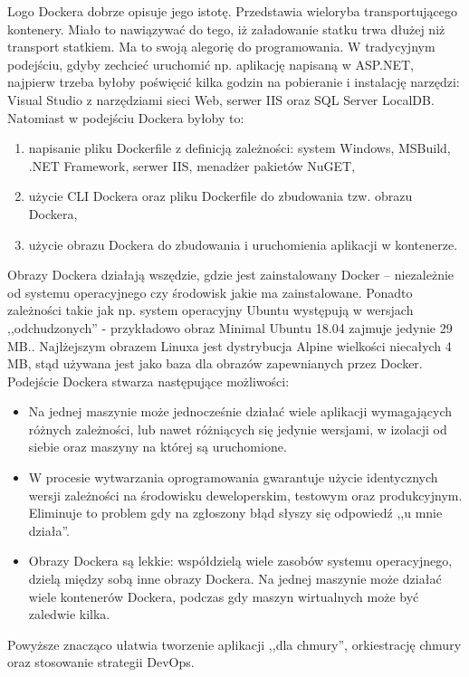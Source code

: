 \documentclass[12pt,a4paper,twoside,titlepage,openright]{book}
\begin{document}
Logo Dockera dobrze opisuje jego istotę. Przedstawia wieloryba transportującego kontenery. Miało to nawiązywać do tego, iż załadowanie statku trwa dłużej niż transport statkiem. Ma to swoją alegorię do programowania. W tradycyjnym podejściu, gdyby zechcieć uruchomić np. aplikację napisaną w ASP.NET, najpierw trzeba byłoby poświęcić kilka godzin na pobieranie i instalację narzędzi: Visual Studio z narzędziami sieci Web, serwer IIS oraz SQL Server LocalDB. Natomiast w podejściu Dockera byłoby to:
\begin{enumerate}
\item napisanie pliku Dockerfile z definicją zależności: system Windows, MSBuild, .NET Framework, serwer IIS, menadżer pakietów NuGET,
\item użycie CLI Dockera oraz pliku Dockerfile do zbudowania tzw. obrazu Dockera,
\item użycie obrazu Dockera do zbudowania i uruchomienia aplikacji w kontenerze.
\end{enumerate}
Obrazy Dockera działają wszędzie, gdzie jest zainstalowany Docker -- niezależnie od systemu operacyjnego czy środowisk jakie ma zainstalowane. Ponadto zależności takie jak np. system operacyjny Ubuntu występują w wersjach ,,odchudzonych'' - przykładowo obraz Minimal Ubuntu 18.04 zajmuje jedynie 29 MB.\cite{siteUbuntuBlog}. Najlżejszym obrazem Linuxa jest dystrybucja Alpine wielkości niecałych 4 MB, stąd używana jest jako baza dla obrazów zapewnianych przez Docker.\cite{dockerPacktMastering}
Podejście Dockera stwarza następujące możliwości:
\begin{itemize}
\item Na jednej maszynie może jednocześnie działać wiele aplikacji wymagających różnych zależności, lub nawet różniących się jedynie wersjami, w izolacji od siebie oraz maszyny na której są uruchomione.
\item W procesie wytwarzania oprogramowania gwarantuje użycie identycznych wersji zależności na środowisku deweloperskim, testowym oraz produkcyjnym. Eliminuje to problem gdy na zgłoszony błąd słyszy się odpowiedź ,,u mnie działa''.
\item Obrazy Dockera są lekkie: współdzielą wiele zasobów systemu operacyjnego, dzielą między sobą inne obrazy Dockera.\cite{siteDockerStackOverflow} Na jednej maszynie może działać wiele kontenerów Dockera, podczas gdy maszyn wirtualnych może być zaledwie kilka.\cite{ccSpringer}
\end{itemize}
Powyższe znacząco ułatwia tworzenie aplikacji ,,dla chmury'', orkiestrację chmury oraz stosowanie strategii DevOps.
\end{document}
